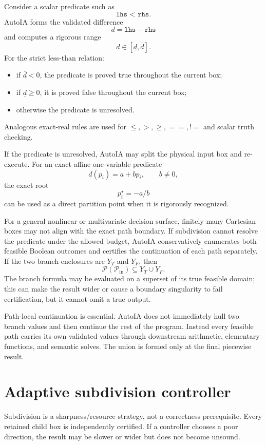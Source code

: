 \documentclass[11pt]{article}
\newcommand{\Pin}{\mathcal{P}_{\mathrm{in}}}
\begin{document}
Consider a scalar predicate such as
\[
  \texttt{lhs < rhs}.
\]
AutoIA forms the validated difference
\[
  d=\texttt{lhs}-\texttt{rhs}
\]
and computes a rigorous range
\[
  d\in[\underline d,\overline d].
\]
For the strict less-than relation:
\begin{itemize}[leftmargin=*]
\item if \(\overline d<0\), the predicate is proved true throughout the current
box;
\item if \(\underline d\ge0\), it is proved false throughout the current box;
\item otherwise the predicate is unresolved.
\end{itemize}
Analogous exact-real rules are used for \(\le,>,\ge,==,!=\) and scalar truth
checking.

If the predicate is unresolved, AutoIA may split the physical input box and
re-execute.  For an exact affine one-variable predicate
\[
  d(p_i)=a+bp_i,
  \qquad b\ne0,
\]
the exact root
\[
  p_i^\star=-a/b
\]
can be used as a direct partition point when it is rigorously recognized.

For a general nonlinear or multivariate decision surface, finitely many Cartesian
boxes may not align with the exact path boundary.  If subdivision cannot resolve
the predicate under the allowed budget, AutoIA conservatively enumerates both
feasible Boolean outcomes and certifies the continuation of each path separately.
If the two branch enclosures are \(Y_T\) and \(Y_F\), then
\[
  \mathcal{P}(\Pin)\subseteq Y_T\cup Y_F.
\]
The branch formula may be evaluated on a superset of its true feasible domain;
this can make the result wider or cause a boundary singularity to fail
certification, but it cannot omit a true output.

Path-local continuation is essential.  AutoIA does not immediately hull two
branch values and then continue the rest of the program.  Instead every feasible
path carries its own validated values through downstream arithmetic, elementary
functions, and semantic solves.  The union is formed only at the final piecewise
result.

\section{Adaptive subdivision controller}

Subdivision is a sharpness/resource strategy, not a correctness prerequisite.
Every retained child box is independently certified.  If a controller chooses a
poor direction, the result may be slower or wider but does not become unsound.
\end{document}
